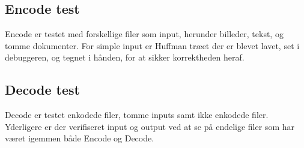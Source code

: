 \documentclass{article}
\begin{document}
\subsection*{Encode test}
Encode er testet med forskellige filer som input, herunder billeder, tekst, og tomme dokumenter.
For simple input er Huffman træet der er blevet lavet, set i debuggeren, og tegnet i hånden, for at sikker korrektheden heraf.
\subsection*{Decode test}
Decode er testet enkodede filer, tomme inputs samt ikke enkodede filer.
Yderligere er der verifiseret input og output ved at se på endelige filer som har været igemmen både Encode og Decode.
\end{document}
